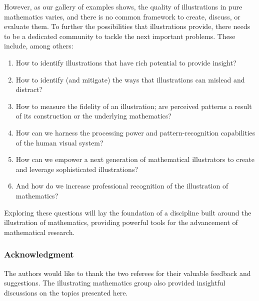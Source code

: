 \documentclass{notices}
\begin{document}
However, as our gallery of examples shows, the quality of illustrations in pure mathematics varies, and there is no common framework to create, discuss, or evaluate them.
To further the possibilities that illustrations provide, there needs to be a dedicated community to tackle the next important problems.
These include, among others:
\begin{enumerate}
    \item How to identify illustrations that have rich potential to provide insight?
    \item How to identify (and mitigate) the ways that illustrations can mislead and distract?
    \item How to measure the fidelity of an illustration; are perceived patterns a result of its construction or the underlying mathematics?
    \item How can we harness the processing power and pattern-recognition capabilities of the human visual system?
    \item How can we empower a next generation of mathematical illustrators to create and leverage sophisticated illustrations?
    \item And how do we increase professional recognition of the illustration of mathematics?
\end{enumerate}
Exploring these questions will lay the foundation of a discipline built around the illustration of mathematics, providing powerful tools for the advancement of mathematical research.

\subsubsection*{Acknowledgment}

The authors would like to thank the two referees for their valuable feedback and suggestions. The illustrating mathematics group also provided insightful discussions on the topics presented here.



\end{document}
